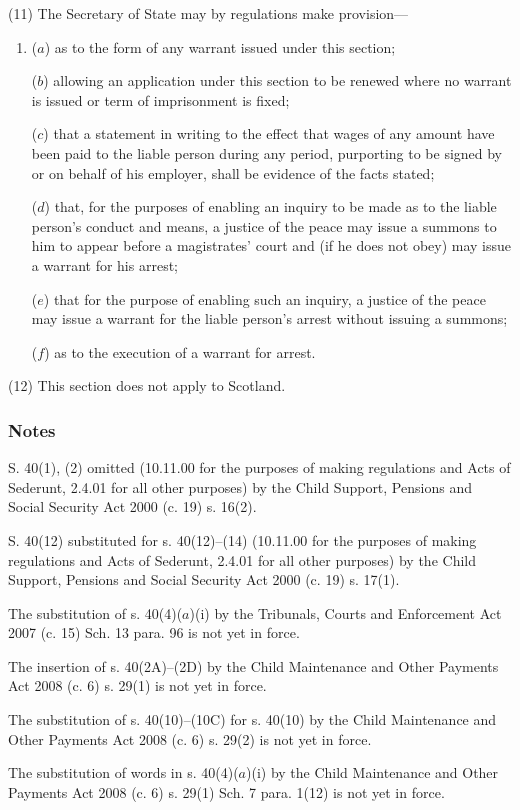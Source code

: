 \documentclass[a4paper]{article}
\newcommand\amendment[1]{\subsubsection*{Notes}{\itshape\frenchspacing\footnotesize #1 \par}}
\begin{document}
(11)
The Secretary of State may by regulations make provision---
\begin{enumerate}\item[]
($a$) as to the form of any warrant issued under this section;

($b$) allowing an application under this section to be renewed where no warrant is issued or term of imprisonment is fixed;

($c$) that a statement in writing to the effect that wages of any amount have been paid to the liable person during any period, purporting to be signed by or on behalf of his employer, shall be evidence of the facts stated;

($d$) that, for the purposes of enabling an inquiry to be made as to the liable person’s conduct and means, a justice of the peace may issue a summons to him to appear before a magistrates’ court and (if he does not obey) may issue a warrant for his arrest;

($e$) that for the purpose of enabling such an inquiry, a justice of the peace may issue a warrant for the liable person’s arrest without issuing a summons;

($f$) as to the execution of a warrant for arrest.
\end{enumerate}

(12) This section does not apply to Scotland.


\amendment{

S. 40(1), (2) omitted (10.11.00 for the purposes of making regulations and Acts of Sederunt, 2.4.01 for all other purposes) by the Child Support, Pensions and Social Security Act 2000 (c. 19) s. 16(2).

S. 40(12) substituted for s. 40(12)--(14)  (10.11.00 for the purposes of making regulations and Acts of Sederunt, 2.4.01 for all other purposes) by the Child Support, Pensions and Social Security Act 2000 (c. 19) s. 17(1).

The substitution of s. 40(4)($a$)(i) by the Tribunals, Courts and Enforcement Act 2007 (c. 15) Sch. 13 para. 96 is not yet in force.

The insertion of s. 40(2A)--(2D) by the Child Maintenance and Other Payments Act 2008 (c. 6) s. 29(1) is not yet in force.

The substitution of s. 40(10)--(10C) for s. 40(10) by the Child Maintenance and Other Payments Act 2008 (c. 6) s. 29(2) is not yet in force.

The substitution of words in s. 40(4)($a$)(i) by the Child Maintenance and Other Payments Act 2008 (c. 6) s. 29(1) Sch. 7 para. 1(12) is not yet in force.



}
\end{document}

